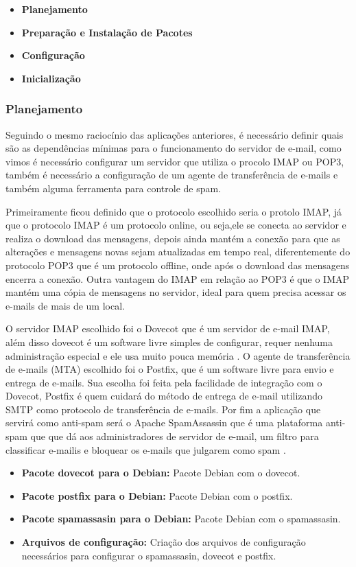  \begin{itemize}
   \item  \textbf{Planejamento}
   \item  \textbf{Preparação e Instalação de Pacotes}
   \item  \textbf{Configuração}
   \item  \textbf{Inicialização}
 \end{itemize}

\subsubsection{Planejamento}

Seguindo o mesmo raciocínio das aplicações anteriores, é necessário definir
quais são as dependências mínimas para o funcionamento do servidor de e-mail,
como vimos é necessário configurar um servidor que utiliza o procolo IMAP ou POP3,
também é necessário a configuração de um agente de transferência de e-mails e também
alguma ferramenta para controle de spam.

Primeiramente ficou definido que o protocolo escolhido seria o protolo IMAP, já
que o protocolo IMAP é um protocolo online, ou seja,ele se conecta ao servidor
e realiza o download das mensagens, depois ainda  mantém a conexão para que
as alterações e mensagens novas sejam atualizadas em tempo real, diferentemente do
protocolo POP3 que é um protocolo offline, onde após o download das mensagens encerra
a conexão. Outra vantagem do IMAP em relação ao POP3 é que o IMAP mantém uma cópia
de mensagens no servidor, ideal para quem precisa acessar os e-mails de mais de um local.

O servidor IMAP escolhido foi o Dovecot que é um servidor de e-mail
IMAP, além disso dovecot é um software livre simples de configurar, requer nenhuma
administração especial e ele usa muito pouca memória \cite{dovecot}. O agente
de transferência de e-mails (MTA) escolhido foi o Postfix, que é um software
livre para envio e entrega de e-mails. Sua escolha foi feita pela facilidade de
integração com o Dovecot, Postfix é quem cuidará do método de entrega de e-mail
utilizando SMTP como protocolo de transferência de e-mails. Por fim a aplicação
que servirá como anti-spam será o Apache SpamAssassin que é uma plataforma anti-spam
que que dá aos administradores de servidor de e-mail, um filtro para classificar
 e-mailis e bloquear os e-mails que julgarem como spam \cite{spam}.

\begin{itemize}
   \item \textbf{Pacote dovecot para o Debian:} Pacote Debian com o dovecot.
   \item \textbf{Pacote postfix para o Debian:} Pacote Debian com o postfix.
   \item \textbf{Pacote spamassasin para o Debian:} Pacote Debian com o spamassasin.
   \item \textbf{Arquivos de configuração:} Criação dos arquivos de configuração
   necessários para configurar o spamassasin, dovecot e postfix.
\end{itemize}

